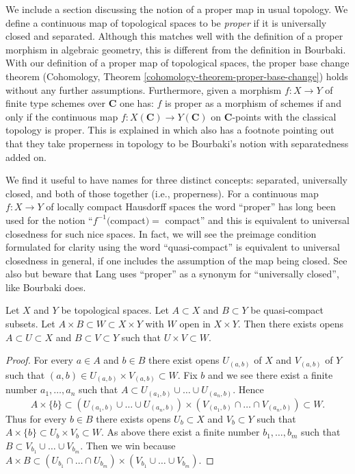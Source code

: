 \noindent
We include a section discussing the notion of a proper map in usual
topology. We define a continuous map of topological spaces to be
{\it proper} if it is universally closed and separated.
Although this matches well with the definition of a proper morphism
in algebraic geometry, this is different from the definition in Bourbaki.
With our definition of a proper map of topological spaces, the
proper base change theorem (Cohomology, Theorem
\ref{cohomology-theorem-proper-base-change})
holds without any further assumptions. Furthermore, given a morphism
$f : X \to Y$ of finite type schemes over $\mathbf{C}$ one
has: $f$ is proper as a morphism of schemes if and only if
the continuous map $f : X(\mathbf{C}) \to Y(\mathbf{C})$
on $\mathbf{C}$-points with the classical topology is proper.
This is explained in \cite[Exp. XII, Prop.\ 3.2(v)]{SGA1}
which also has a footnote pointing out that they take properness
in topology to be Bourbaki's notion with separatedness added on.

\medskip\noindent
We find it useful to have names for three distinct concepts:
separated, universally closed, and both of those together (i.e., properness).
For a continuous map $f : X \to Y$ of locally compact Hausdorff spaces
the word ``proper'' has long been used for the notion
``$f^{-1}($compact$) =$ compact'' and
this is equivalent to universal closedness for such nice spaces.
In fact, we will see the preimage condition formulated for clarity
using the word ``quasi-compact'' is equivalent to universal closedness
in general, if one includes the assumption of the map being closed. See
also \cite[Exercises 22-26 in Chapter II]{LangReal} but
beware that Lang uses ``proper'' as a synonym for ``universally closed'',
like Bourbaki does.

\begin{lemma}
\label{lemma-tube}
Let $X$ and $Y$ be topological spaces.
Let $A \subset X$ and $B \subset Y$ be quasi-compact subsets.
Let $A \times B \subset W \subset X \times Y$ with $W$
open in $X \times Y$. Then there exists opens $A \subset U \subset X$
and $B \subset V \subset Y$ such that $U \times V \subset W$.
\end{lemma}

\begin{proof}
For every $a \in A$ and $b \in B$ there exist opens
$U_{(a, b)}$ of $X$ and $V_{(a, b)}$ of $Y$ such that
$(a, b) \in U_{(a, b)} \times V_{(a, b)} \subset W$.
Fix $b$ and we see there exist a finite number $a_1, \ldots, a_n$
such that $A \subset U_{(a_1, b)} \cup \ldots \cup U_{(a_n, b)}$.
Hence
$$
A \times \{b\} \subset
(U_{(a_1, b)} \cup \ldots \cup U_{(a_n, b)}) \times
(V_{(a_1, b)} \cap \ldots \cap V_{(a_n, b)}) \subset W.
$$
Thus for every $b \in B$ there exists opens $U_b \subset X$ and
$V_b \subset Y$ such that $A \times \{b\} \subset U_b \times V_b \subset W$.
As above there exist a finite number $b_1, \ldots, b_m$ such
that $B \subset V_{b_1} \cup \ldots \cup V_{b_m}$.
Then we win because
$A \times B \subset
(U_{b_1} \cap \ldots \cap U_{b_m}) \times
(V_{b_1} \cup \ldots \cup V_{b_m})$.
\end{proof}

